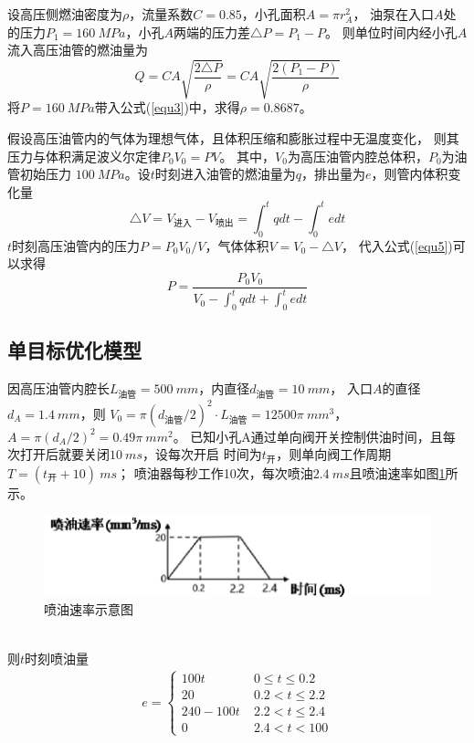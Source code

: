 \documentclass[withoutpreface,bwprint]{cumcmthesis} %
\begin{document}
    
    设高压侧燃油密度为$\rho$，流量系数$C=0.85$，小孔面积$A=\pi r_{A}^2$，
    油泵在入口$A$处的压力$P_1=160~MPa$，小孔$A$两端的压力差$\triangle P=P_1-P$。
    则单位时间内经小孔$A$流入高压油管的燃油量为
    \begin{equation}
        Q=CA\sqrt{\frac{2\triangle P}{\rho}}=CA\sqrt{\frac{2(P_1-P)}{\rho}}
    \label{equ4}
    \end{equation}    
    将$P=160~MPa$带入公式(\ref{equ3})中，求得$\rho=0.8687$。

    假设高压油管内的气体为理想气体，且体积压缩和膨胀过程中无温度变化，
    则其压力与体积满足波义尔定律$P_0V_0=PV$。
    其中，$V_0$为高压油管内腔总体积，$P_0$为油管初始压力
    $100~MPa$。设$t$时刻进入油管的燃油量为$q$，排出量为$e$，则管内体积变化量
    \begin{equation}
        \triangle V=V_{\text{进入}}-V_{\text{喷出}}=\int_0^t q dt-\int_0^t e dt
    \label{equ5}
    \end{equation}
    $t$时刻高压油管内的压力$P=P_0V_0 / V$，气体体积$V=V_0-\triangle V$，
    代入公式(\ref{equ5})可以求得
    \begin{equation}
        P=\frac{P_0V_0}{V_0-\int_0^t q dt+\int_0^t e dt}
    \label{equ6}
    \end{equation}

\subsection{单目标优化模型}
    因高压油管内腔长$L_{\text{油管}}=500~mm$，内直径$d_{\text{油管}}=10~mm$，
    入口$A$的直径$d_A=1.4~mm$，则
    $V_0=\pi (d_{\text{油管}}/2)^2\cdot L_{\text{油管}}=12500\pi ~mm^3$，
    $A=\pi (d_A/2)^2=0.49\pi ~mm^2$。
    已知小孔A通过单向阀开关控制供油时间，且每次打开后就要关闭$10~ms$，设每次开启
    时间为$t_{\text{开}}$，则单向阀工作周期$T=(t_{\text{开}} + 10)~ms$；
    喷油器每秒工作10次，每次喷油$2.4~ms$且喷油速率如图\ref{figure2}所示。
    \begin{figure}[htbp]
        \centering
        \includegraphics[width=.7\textwidth]{E_rate.png}
        \caption{喷油速率示意图}
        \label{figure2}
    \end{figure} \\
    则$t$时刻喷油量
    \begin{eqnarray}
    e=
    \begin{cases}
        100t \quad \quad \quad & 0 \leq t \leq 0.2 \\
        20   & 0.2 < t \leq 2.2 \\
        240-100t  & 2.2 < t \leq 2.4 \\
        0 & 2.4 < t <100
    \end{cases}
    \label{equ7}
    \end{eqnarray}
\end{document}
